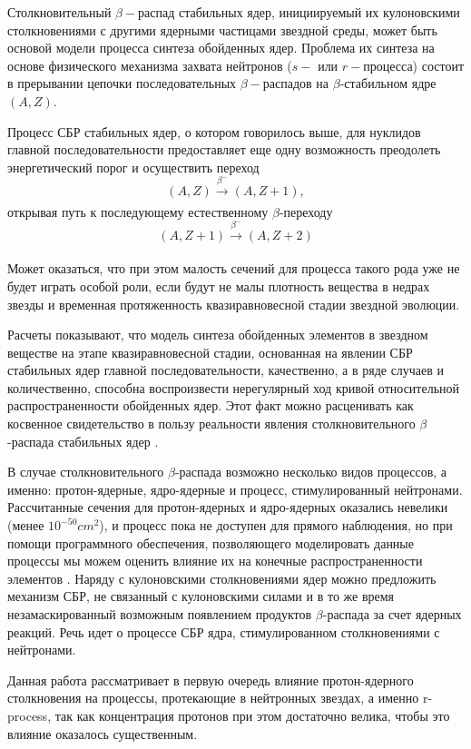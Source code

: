 \documentclass[14pt, a4paper]{article}
\numberwithin{figure}{section}
\numberwithin{equation}{section}
\begin{document}
Столкновительный $\beta-$распад стабильных ядер, инициируемый их кулоновскими столкновениями с другими ядерными частицами звездной среды, может быть основой модели процесса синтеза обойденных ядер.
Проблема их синтеза на основе физического механизма захвата нейтронов ($s-$ или $r-$процесса) состоит в прерывании цепочки последовательных $\beta-$распадов на $\beta$-стабильном ядре $(A,Z)$.

Процесс СБР стабильных ядер, о котором говорилось выше, для нуклидов главной последовательности предоставляет еще одну возможность преодолеть энергетический порог и осуществить переход 
$$(A,Z) \xrightarrow[]{\beta^-} (A,Z + 1),$$
открывая путь к последующему естественному $\beta$-переходу
$$(A,Z+1) \xrightarrow[]{\beta^-} (A,Z + 2)$$

Может оказаться, что при этом малость сечений для процесса такого рода уже не будет играть особой роли, если будут не малы плотность вещества в недрах звезды и временная протяженность квазиравновесной стадии звездной эволюции.

Расчеты показывают, что модель синтеза обойденных элементов в звездном веществе на этапе квазиравновесной стадии, основанная на явлении СБР стабильных ядер главной последовательности, качественно, а в ряде случаев и количественно, способна воспроизвести нерегулярный ход кривой относительной распространенности обойденных ядер. Этот факт можно расценивать как косвенное свидетельство в пользу реальности явления столкновительного $\beta$-распада стабильных ядер \cite{tak}.

В случае столкновительного $\beta$-распада возможно несколько видов процессов, а именно: протон-ядерные, ядро-ядерные и процесс, стимулированный нейтронами. Рассчитанные сечения для протон-ядерных и ядро-ядерных оказались невелики (менее $10^{-50}cm^2$), и процесс пока не доступен для прямого наблюдения, но при помощи программного обеспечения, позволяющего моделировать данные процессы мы можем оценить влияние их на конечные распространенности элементов \cite{tak_article}. Наряду с кулоновскими столкновениями ядер можно предложить механизм СБР, не связанный с кулоновскими силами и в то же время незамаскированный возможным появлением продуктов $\beta$-распада за счет ядерных реакций. Речь идет о процессе СБР ядра, стимулированном столкновениями с нейтронами.

Данная работа рассматривает в первую очередь влияние протон-ядерного столкновения на процессы, протекающие в нейтронных звездах, а именно r-process, так как концентрация протонов при этом достаточно велика, чтобы это влияние оказалось существенным. 
\end{document}
